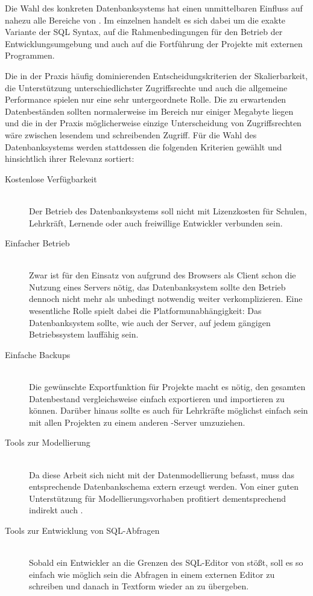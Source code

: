 Die Wahl des konkreten Datenbanksystems hat einen unmittelbaren Einfluss auf nahezu alle Bereiche von \idename. Im einzelnen handelt es sich dabei um die exakte Variante der SQL Syntax, auf die Rahmenbedingungen für den Betrieb der Entwicklungsumgebung und auch auf die Fortführung der Projekte mit externen Programmen.

Die in der Praxis häufig dominierenden Entscheidungskriterien der Skalierbarkeit, die Unterstützung unterschiedlichster Zugriffsrechte und auch die allgemeine Performance spielen nur eine sehr untergeordnete Rolle. Die zu erwartenden Datenbeständen sollten normalerweise im Bereich nur einiger Megabyte liegen und die in der Praxis möglicherweise einzige Unterscheidung von Zugriffsrechten wäre zwischen lesendem und schreibenden Zugriff. Für die Wahl des Datenbanksystems werden stattdessen die folgenden Kriterien gewählt und hinsichtlich ihrer Relevanz sortiert:

\begin{description}  
\item[Kostenlose Verfügbarkeit] \hfill \\
  Der Betrieb des Datenbanksystems soll nicht mit Lizenzkosten für Schulen, Lehrkräft, Lernende oder auch freiwillige Entwickler verbunden sein.
\item[Einfacher Betrieb] \hfill \\
  Zwar ist für den Einsatz von \idename{} aufgrund des Browsers als Client schon die Nutzung eines Servers nötig, das Datenbanksystem sollte den Betrieb dennoch nicht mehr als unbedingt notwendig weiter verkomplizieren. Eine wesentliche Rolle spielt dabei die Platformunabhängigkeit: Das Datenbanksystem sollte, wie auch der \idename{} Server, auf jedem gängigen Betriebssystem lauffähig sein.
\item[Einfache Backups] \hfill \\
  Die gewünschte Exportfunktion für Projekte macht es nötig, den gesamten Datenbestand vergleichsweise einfach exportieren und importieren zu können. Darüber hinaus sollte es auch für Lehrkräfte möglichst einfach sein mit allen Projekten zu einem anderen \idename-Server umzuziehen.
\item[Tools zur Modellierung] \hfill \\
  Da diese Arbeit sich nicht mit der Datenmodellierung befasst, muss das entsprechende Datenbankschema extern erzeugt werden. Von einer guten Unterstützung für Modellierungsvorhaben profitiert dementsprechend indirekt auch \idename.
\item[Tools zur Entwicklung von SQL-Abfragen] \hfill \\
  Sobald ein Entwickler an die Grenzen des SQL-Editor von \idename{} stößt, soll es so einfach wie möglich sein die Abfragen in einem externen Editor zu schreiben und danach in Textform wieder an \idename{} zu übergeben.
\end{description}

